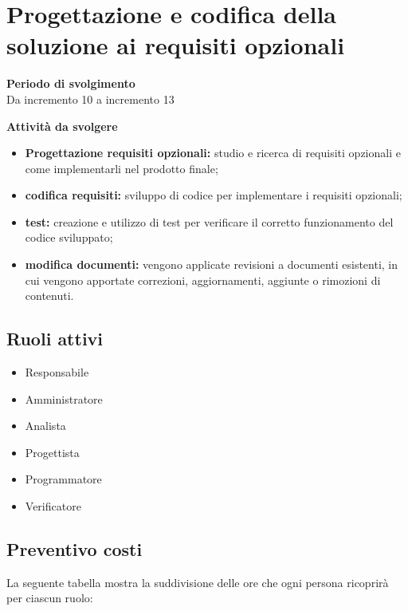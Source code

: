 \section{Progettazione e codifica della soluzione ai requisiti opzionali}

\textbf{Periodo di svolgimento}
\\ Da incremento 10 a incremento 13

\textbf{Attività da svolgere}
    \begin{itemize}
        \item \textbf{Progettazione requisiti opzionali:} studio e ricerca di requisiti opzionali e come implementarli nel prodotto finale; 
        \item \textbf{codifica requisiti:} sviluppo di codice per implementare i requisiti opzionali;
        \item \textbf{test:} creazione e utilizzo di test per verificare il corretto funzionamento del codice sviluppato;
        \item \textbf{modifica documenti:} vengono applicate revisioni a documenti esistenti, in cui vengono apportate correzioni, aggiornamenti, aggiunte o rimozioni di contenuti.
    \end{itemize}

\subsection{Ruoli attivi}
\begin{itemize}
    \item Responsabile 
    \item Amministratore 
    \item Analista 
    \item Progettista 
    \item Programmatore 
    \item Verificatore 
\end{itemize}

\subsection{Preventivo costi}

La seguente tabella mostra la suddivisione delle ore che ogni persona ricoprirà per ciascun ruolo:

